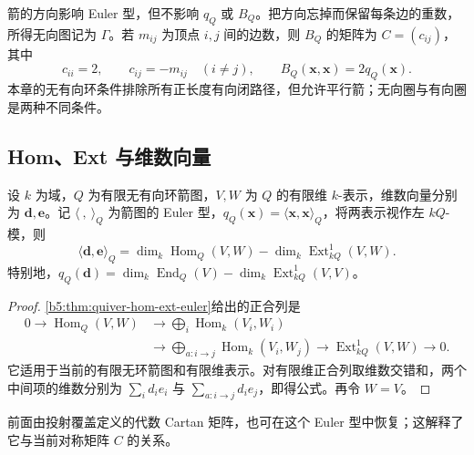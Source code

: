 箭的方向影响 Euler 型，但不影响 \(q_Q\) 或 \(B_Q\)。把方向忘掉而保留每条边的重数，所得无向图记为 \(\Gamma\)。若 \(m_{ij}\) 为顶点 \(i,j\) 间的边数，则 \(B_Q\) 的矩阵为 \(C=(c_{ij})\)，其中
\[
	c_{ii}=2,\qquad c_{ij}=-m_{ij}\quad(i\neq j),\qquad B_Q(\mathbf x,\mathbf x)=2q_Q(\mathbf x).
\]
本章的无有向环条件排除所有正长度有向闭路径，但允许平行箭；无向圈与有向圈是两种不同条件。

\subsection{Hom、Ext 与维数向量}
\label{b5:subsec:1001:02}

\begin{proposition}\label{b5:prop:quiver-euler-hom-ext}
	设 \(k\) 为域，\(Q\) 为有限无有向环箭图，\(V,W\) 为 \(Q\) 的有限维 \(k\)-表示，维数向量分别为 \(\mathbf d,\mathbf e\)。记 \(\langle\ ,\ \rangle_Q\) 为箭图的 Euler 型，\(q_Q(\mathbf x)=\langle\mathbf x,\mathbf x\rangle_Q\)，将两表示视作左 \(kQ\)-模，则
	\begin{equation}\label{b5:eq:quiver-euler-hom-ext}
		\langle\mathbf d,\mathbf e\rangle_Q =\dim_k\operatorname{Hom}_Q(V,W) -\dim_k\operatorname{Ext}^1_{kQ}(V,W).
	\end{equation}
	特别地，\(q_Q(\mathbf d)=\dim_k\operatorname{End}_Q(V)- \dim_k\operatorname{Ext}^1_{kQ}(V,V)\)。
\end{proposition}
\begin{proof}
	\cref{b5:thm:quiver-hom-ext-euler}给出的正合列是
	\[
		\begin{aligned}
			0\longrightarrow\operatorname{Hom}_Q(V,W) &\longrightarrow\bigoplus_i\operatorname{Hom}_k(V_i,W_i)\\
			&\longrightarrow\bigoplus_{a:i\to j}\operatorname{Hom}_k(V_i,W_j) \longrightarrow\operatorname{Ext}^1_{kQ}(V,W)\longrightarrow0.
		\end{aligned}
	\]
	它适用于当前的有限无环箭图和有限维表示。对有限维正合列取维数交错和，两个中间项的维数分别为 \(\sum_i d_i e_i\) 与 \(\sum_{a:i\to j}d_i e_j\)，即得公式。再令 \(W=V\)。
\end{proof}

前面由投射覆盖定义的代数 Cartan 矩阵，也可在这个 Euler 型中恢复；这解释了它与当前对称矩阵 \(C\) 的关系。

